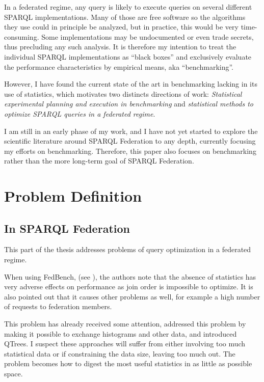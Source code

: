 \documentclass{llncs}
\begin{document}
In a federated regime, any query is likely to execute queries on
several different SPARQL implementations. Many of those are free
software so the algorithms they use could in principle be analyzed,
but in practice, this would be very time-consuming. Some
implementations may be undocumented or even trade secrets, thus
precluding any such analysis. It is therefore my intention to treat
the individual SPARQL implementations as ``black boxes'' and
exclusively evaluate the performance characteristics by empirical
means, aka ``benchmarking''.

However, I have found the current state of the art in benchmarking
lacking in its use of statistics, which motivates two distincts
directions of work: \emph{Statistical experimental planning and execution in
benchmarking} and \emph{statistical methods to optimize SPARQL queries
in a federated regime}.

I am still in an early phase of my work, and I have not yet started to
explore the scientific literature around SPARQL Federation to any
depth, currently focusing my efforts on benchmarking. Therefore, this
paper also focuses on benchmarking rather than the more long-term goal
of SPARQL Federation.

\section{Problem Definition}

\subsection{In SPARQL Federation}

This part of the thesis addresses problems of query optimization in a
federated regime.

When using FedBench, (see \cite{Schmidt:2011:FBS:2063016.2063054}),
the authors note that the absence of statistics has very adverse
effects on performance as join order is impossible to optimize. It is
also pointed out that it causes other problems as well, for example a
high number of requests to federation members. 

This problem has already received some attention, \cite{5337556}
addressed this problem by making it possible to exchange histograms
and other data, and \cite{Harth:2010:DSO:1772690.1772733} introduced
QTrees. I suspect these approaches will suffer from either involving
too much statistical data or if constraining the data size, leaving
too much out. The problem becomes how to digest the most useful
statistics in as little as possible space. %
\end{document}

